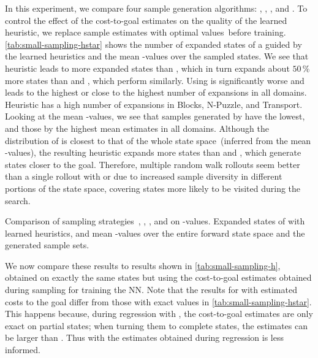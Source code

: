 In this experiment, we compare four sample generation algorithms: \bfs, \dfs, \rw, and \bfsrw. To control the effect of the cost-to-goal estimates on the quality of the learned heuristic, we replace sample estimates with optimal values~\hstar before training. \cref{tab:small-sampling-hstar} shows the number of expanded states of a \gbfs guided by the learned heuristics and the mean \hstar-values over the sampled states. We see that heuristic \hnnl{\bfs} leads to more expanded states than \hnnl{\dfs}, which in turn expands about $50\,\%$ more states than \hnnl{\rw} and \hnnl{\bfsrw}, which perform similarly. Using \hnnl{\bfs} is significantly worse and leads to the highest or close to the highest number of expansions in all domains. Heuristic \hnnl{\dfs} has a high number of expansions in Blocks, N-Puzzle, and Transport. Looking at the mean \hstar-values, we see that samples generated by \bfs have the lowest, and those by \dfs the highest mean estimates in all domains. Although the distribution of \dfs is closest to that of the whole state space~(inferred from the mean \hstar-values), the resulting heuristic expands more states than \rw and \bfsrw, which generate states closer to the goal. Therefore, multiple random walk rollouts seem better than a single rollout with \bfs or \dfs due to increased sample diversity in different portions of the state space, covering states more likely to be visited during the search.

\begin{table}[tb]
    \caption[Comparison of sampling strategies on \hstar-values.]{Comparison of sampling strategies~\bfs, \dfs, \rw, and \bfsrw on \hstar-values. Expanded states of \gbfs with learned heuristics, and mean \hstar-values over the entire forward state space and the generated sample sets.}
    \label{tab:small-sampling-hstar}
    \addmargin
    \centering
    
\end{table}

We now compare these results to results shown in \cref{tab:small-sampling-h}, obtained on exactly the same states but using the cost-to-goal estimates obtained during sampling for training the NN. Note that the results for \bfs with estimated costs to the goal differ from those with exact values in \cref{tab:small-sampling-hstar}. This happens because, during regression with \bfs, the cost-to-goal estimates are only exact on partial states; when turning them to complete states, the estimates can be larger than \hstar. Thus \hnnl{\bfs} with the estimates obtained during regression is less informed.

